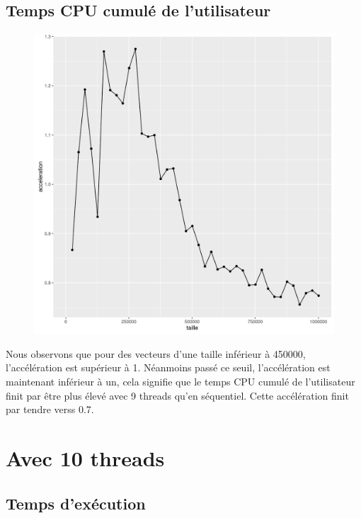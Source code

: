 \documentclass[a4paper,11pt]{scrartcl}
\begin{document}
\subsection{Temps CPU cumul\'e de l'utilisateur}
\begin{figure}[H] \center
   \includegraphics[scale=0.5] {graphes/temps_user_accel9.png}
\end{figure}
Nous observons que pour des vecteurs d'une taille inf\'erieur \`a 450000, l'acc\'el\'eration est sup\'erieur \`a 1. N\'eanmoins pass\'e ce seuil,  l'acc\'el\'eration est maintenant inf\'erieur \`a un, cela signifie que le temps CPU cumul\'e de l'utilisateur finit par \^{e}tre plus \'elev\'e avec 9 threads qu'en s\'equentiel. Cette acc\'el\'eration finit par tendre verss 0.7.


\section{Avec 10 threads}
\subsection{Temps d'ex\'ecution}
\end{document}
